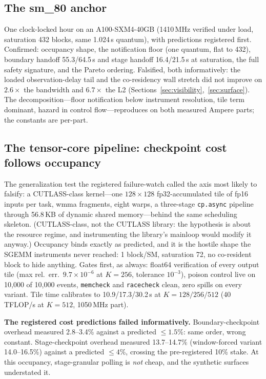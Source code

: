 \documentclass[11pt]{article}
\newcommand{\us}{\,\textmu s\xspace}
\begin{document}
\subsection{The sm\_80 anchor}
\label{sec:a100}

One clock-locked hour on an A100-SXM4-40GB (1410\,MHz verified under
load, saturation 432 blocks, same 1.024\us{} quantum), with
predictions registered first. Confirmed: occupancy shape, the
notification floor (one quantum, flat to 432), boundary handoff
55.3/64.5\us{} and stage handoff 16.4/21.5\us{} at saturation, the
full safety signature, and the Pareto ordering. Falsified, both
informatively: the loaded observation-delay tail and the
co-residency wall stretch did not improve on $2.6\times$ the
bandwidth and $6.7\times$ the L2
(Sections~\ref{sec:visibility},~\ref{sec:surface}). The
decomposition---floor notification below instrument resolution, tile
term dominant, hazard in control flow---reproduces on both measured
Ampere parts; the constants are per-part.

\subsection{The tensor-core pipeline: checkpoint cost follows
occupancy}
\label{sec:tc}

The generalization test the registered failure-watch called the axis
most likely to falsify: a CUTLASS-class kernel---one
$128{\times}128$ fp32-accumulated tile of fp16 inputs per task,
wmma fragments, eight warps, a three-stage \texttt{cp.async}
pipeline through 56.8\,KB of dynamic shared memory---behind the same
scheduling skeleton. (CUTLASS-class, not the CUTLASS library: the
hypothesis is about the resource regime, and instrumenting the
library's mainloop would modify it anyway.) Occupancy binds exactly
as predicted, and it is the hostile shape the SGEMM instruments
never reached: 1 block/SM, saturation 72, no co-resident block to
hide anything. Gates first, as always: float64 verification of every
output tile (max rel.\ err.\ $9.7{\times}10^{-6}$ at $K{=}256$,
tolerance $10^{-3}$), poison control live on 10{,}000 of 10{,}000
events, \texttt{memcheck} and \texttt{racecheck} clean, zero spills
on every variant. Tile time calibrates to 10.9/17.3/30.2\us{} at
$K{=}128/256/512$ (40\,TFLOP/s at $K{=}512$, 1050\,MHz part).

\textbf{The registered cost predictions failed informatively.}
Boundary-checkpoint overhead measured 2.8--3.4\% against a predicted
${\le}1.5$\%: same order, wrong constant. Stage-checkpoint overhead
measured 13.7--14.7\% (window-forced variant 14.0--16.5\%) against a
predicted ${\le}4$\%, crossing the pre-registered 10\% stake. At
this occupancy, stage-granular polling is \emph{not} cheap, and the
synthetic surfaces understated it.
\end{document}
